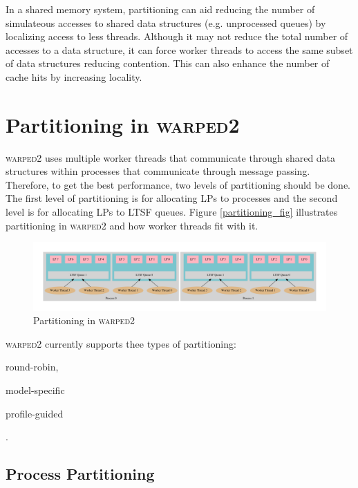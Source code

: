 \documentclass[11pt]{book}
\begin{document}
In a shared memory system, partitioning can aid reducing the number of simulateous accesses
to shared data structures (e.g. unprocessed queues) by localizing access to less threads.
Although it may not reduce the total number of accesses to a data structure, it can force
worker threads to access the same subset of data structures reducing contention. This can
also enhance the number of cache hits by increasing locality.

\section{Partitioning in \textsc{warped2}}

\textsc{warped2} uses multiple worker threads that communicate through shared data structures
within processes that communicate through message passing. Therefore, to get the best
performance, two levels of partitioning should be done. The first level of partitioning is
for allocating LPs to processes and the second level is for allocating LPs to LTSF queues.
Figure \ref{partitioning_fig} illustrates partitioning in \textsc{warped2} and how worker
threads fit with it.

\begin{figure}[H]
    \centering
    \includegraphics[width=\textwidth]{figs/graphviz/partitioning.pdf}
    \caption{Partitioning in \textsc{warped2}}\label{partitionig_fig}
\end{figure}

\textsc{warped2} currently supports thee types of partitioning: \begin{inparaenum}[(1)]
\item round-robin, \item model-specific \item profile-guided \end{inparaenum}.

\subsection{Process Partitioning}

\end{document}
